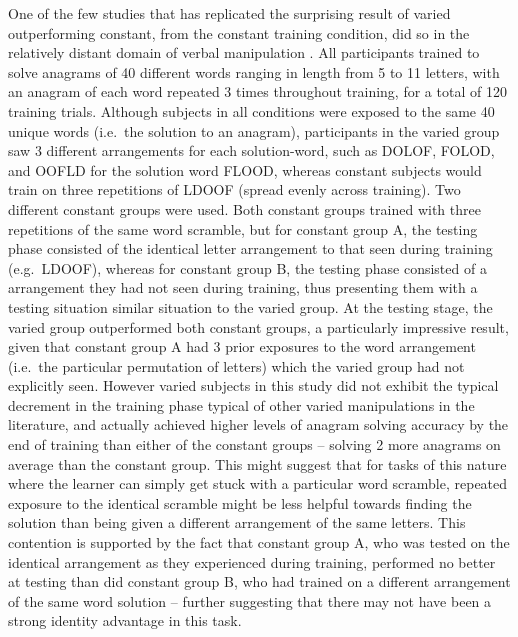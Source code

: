 \documentclass[
  12pt,
  letterpaper,
]{article}
\begin{document}
One of the few studies that has replicated the surprising result of
varied outperforming constant, from the constant training condition, did
so in the relatively distant domain of verbal manipulation
\autocite{goodeSuperiorityVariableRepeated2008}. All participants
trained to solve anagrams of 40 different words ranging in length from 5
to 11 letters, with an anagram of each word repeated 3 times throughout
training, for a total of 120 training trials. Although subjects in all
conditions were exposed to the same 40 unique words (i.e.~the solution
to an anagram), participants in the varied group saw 3 different
arrangements for each solution-word, such as DOLOF, FOLOD, and OOFLD for
the solution word FLOOD, whereas constant subjects would train on three
repetitions of LDOOF (spread evenly across training). Two different
constant groups were used. Both constant groups trained with three
repetitions of the same word scramble, but for constant group A, the
testing phase consisted of the identical letter arrangement to that seen
during training (e.g.~LDOOF), whereas for constant group B, the testing
phase consisted of a arrangement they had not seen during training, thus
presenting them with a testing situation similar situation to the varied
group. At the testing stage, the varied group outperformed both constant
groups, a particularly impressive result, given that constant group A
had 3 prior exposures to the word arrangement (i.e.~the particular
permutation of letters) which the varied group had not explicitly seen.
However varied subjects in this study did not exhibit the typical
decrement in the training phase typical of other varied manipulations in
the literature, and actually achieved higher levels of anagram solving
accuracy by the end of training than either of the constant groups --
solving 2 more anagrams on average than the constant group. This might
suggest that for tasks of this nature where the learner can simply get
stuck with a particular word scramble, repeated exposure to the
identical scramble might be less helpful towards finding the solution
than being given a different arrangement of the same letters. This
contention is supported by the fact that constant group A, who was
tested on the identical arrangement as they experienced during training,
performed no better at testing than did constant group B, who had
trained on a different arrangement of the same word solution -- further
suggesting that there may not have been a strong identity advantage in
this task.
\end{document}
